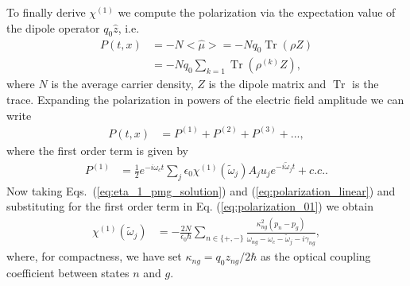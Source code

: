 \documentclass[preprint,secnumarabic,amssymb, nobibnotes, aip, prd]{revtex4-1}
\def\tw{\tilde{\omega}}
\def\tw{\tilde{\omega}}
\DeclareMathOperator{\Tr}{Tr}
\begin{document}
	To finally derive $\chi^{(1)}$ we compute the polarization via the expectation value of the dipole operator $q_0\hat{z}$, i.e. 
	\begin{align}
	\label{eq:polarization_01}
	P(t,x) &= -N<\hat \mu> = -N q_0\Tr(\rho Z)\nonumber \\
	&= -Nq_0\sum_{k=1}\Tr(\rho^{(k)}Z),
	\end{align}
	where $N$ is the average carrier density, $Z$ is the dipole matrix and $\Tr$ is the trace. Expanding the polarization in powers of the electric field amplitude we can write 
	\begin{align}
	\label{eq:polarization_02}
	P(t,x) &= P^{(1)}+P^{(2)}+P^{(3)} + ...,
	\end{align}
	where the first order term is given by 
	\begin{align}
	\label{eq:polarization_linear}
	P^{(1)} &=  \frac{1}{2}e^{-i\omega_ct}\sum_{j}\epsilon_0 \chi^{(1)}(\tilde{\omega}_j) A_ju_je^{-i\tw_jt} + c.c..
	\end{align}
	Now taking Eqs.~(\ref{eq:eta_1_pmg_solution}) and (\ref{eq:polarization_linear}) and substituting for the first order term in Eq. (\ref{eq:polarization_01}) we obtain 
	\begin{align}
	\label{eq:polarization_linear_final}
	\chi^{(1)}(\tw_j) &=  -\frac{2N}{\epsilon_0\hbar}\sum_{n\in \{+,-\}} \frac{\kappa_{ng}^2(p_n-p_g)}{\omega_{ng}-\omega_c-\tw_j-i\gamma_{ng}},
	\end{align}
	where, for compactness, we have set $\kappa_{ng} = q_0z_{ng}/2\hbar$ as the optical coupling coefficient between states $n$ and $g$. 
	
\end{document}
